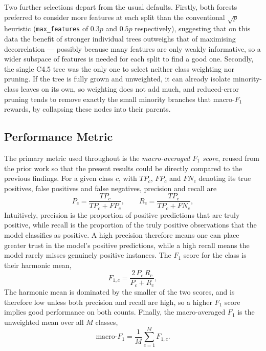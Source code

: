 \documentclass[conference]{IEEEtran}
\begin{document}
Two further selections depart from the usual defaults. Firstly, both forests preferred to consider more
features at each split than the conventional $\sqrt{p}$ heuristic (\texttt{max\_features} of $0.3p$ and $0.5p$ respectively), 
suggesting that on this data the benefit of stronger individual trees outweighs that
of maximising decorrelation --- possibly because many features are only weakly informative, so a wider
subspace of features is needed for each split to find a good one. Secondly, the single C4.5 tree was the only one to
select neither class weighting nor pruning. If the tree is fully grown and unweighted, it can already isolate
minority-class leaves on its own, so weighting does not add much, and reduced-error pruning tends to 
remove exactly the small minority branches that macro-$F_1$ rewards, by collapsing these nodes into their parents. 

\subsection{Performance Metric} %

The primary metric used throughout is the \emph{macro-averaged $F_1$ score}, reused from the prior
work so that the present results could be directly compared to the previous findings. For a given class 
$c$, with $TP_c$, $FP_c$ and $FN_c$ denoting its true positives, false positives and false negatives, 
precision and recall are
\begin{equation}
P_c = \frac{TP_c}{TP_c + FP_c}, \qquad R_c = \frac{TP_c}{TP_c + FN_c},
\end{equation}
Intuitively, precision is the proportion of positive predictions that are truly positive, while
recall is the proportion of the truly positive observations that the model classifies as positive.
A high precision therefore means one can place greater trust in the model's positive predictions,
while a high recall means the model rarely misses genuinely positive instances. The $F_1$ score for
the class is their harmonic mean,
\begin{equation}
F_{1,c} = \frac{2\,P_c\,R_c}{P_c + R_c},
\end{equation}
The harmonic mean is dominated by the smaller of the two scores, and is therefore low unless both
precision and recall are high, so a higher $F_1$ score implies good performance on both counts.
Finally, the macro-averaged $F_1$ is the unweighted mean over all $M$ classes,
\begin{equation}
\mathrm{macro\text{-}}F_1 = \frac{1}{M}\sum_{c=1}^{M} F_{1,c}.
\end{equation}
\end{document}
